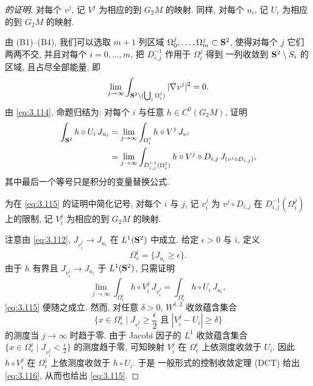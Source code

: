 \begin{proof}[ 的证明]
对每个 $v^j$, 记 $V^j$ 为相应的到 $G_2M$ 的映射. 同样, 对每个 $u_i$,
记 $U_i$ 为相应的到 $G_2M$ 的映射.

由 (B1)--(B4), 我们可以选取 $m+1$ 列区域
$\Omega_0^j,\dots,\Omega_m^j\subset\mathbf{S}^2$, 使得对每个 $j$ 它们两两不交,
并且对每个 $i=0,\dots,m$, 把 $D_{i,j}^{-1}$ 作用于 $\Omega_i^j$ 得到
一列收敛到 $\mathbf{S}^2\setminus S_i$ 的区域, 且占尽全部能量, 即
\begin{equation}
\lim_{j\to\infty}\int_{\mathbf{S}^2\setminus(\bigcup_i\Omega_i^j)}
 |\nabla v^j|^2=0.
\label{eq:3.114}
\end{equation}
由 \eqref{eq:3.114}, 命题归结为: 对每个 $i$ 与任意 $h\in C^0(G_2M)$, 证明
\begin{equation}
\begin{aligned}
\int_{\mathbf{S}^2}h\circ U_i\,J_{u_i}
&=\lim_{j\to\infty}\int_{\Omega_i^j}h\circ V^j\,J_{v^j}\\
&=\lim_{j\to\infty}\int_{D_{i,j}^{-1}(\Omega_i^j)}
 h\circ V^j\circ D_{i,j}\,J_{(v^j\circ D_{i,j})},
\end{aligned}
\label{eq:3.115}
\end{equation}
其中最后一个等号只是积分的变量替换公式.

为在 \eqref{eq:3.115} 的证明中简化记号, 对每个 $i$ 与 $j$, 记 $v_i^j$ 为
$v^j\circ D_{i,j}$ 在 $D_{i,j}^{-1}(\Omega_i^j)$ 上的限制, 记 $V_i^j$
为相应的到 $G_2M$ 的映射.

注意由 \eqref{eq:3.112}, $J_{v_i^j}\to J_{u_i}$ 在 $L^1(\mathbf{S}^2)$ 中成立. 给定
$\epsilon>0$ 与 $i$, 定义
\[
\Omega_\epsilon^i=\bigl\{J_{u_i}\geq\epsilon\bigr\}.
\]
由于 $h$ 有界且 $J_{v_i^j}\to J_{u_i}$ 于 $L^1(\mathbf{S}^2)$, 只需证明
\begin{equation}
\lim_{j\to\infty}\int_{\Omega_\epsilon^i}h\circ V_i^j\,J_{v_i^j}
 =\int_{\Omega_\epsilon^i}h\circ U_i\,J_{u_i},
\label{eq:3.116}
\end{equation}
\eqref{eq:3.115} 便随之成立. 然而, 对任意 $\delta>0$, $W^{1,2}$ 收敛蕴含集合
\begin{equation}
\bigl\{x\in\Omega_\epsilon^i\mid J_{v_i^j}\geq\frac\epsilon2
 \text{ 且 } |V_i^j-U_i|\geq\delta\bigr\}
\label{eq:3.117}
\end{equation}
的测度当 $j\to\infty$ 时趋于零. 由于 Jacobi 因子的 $L^1$ 收敛蕴含集合
$\{x\in\Omega_\epsilon^i\mid J_{v_i^j}<\frac\epsilon2\}$ 的测度趋于零,
可知映射 $V_i^j$ 在 $\Omega_\epsilon^i$ 上依测度收敛于 $U_i$. 因此
$h\circ V_i^j$ 在 $\Omega_\epsilon^i$ 上依测度收敛于 $h\circ U_i$. 于是
一般形式的控制收敛定理 (DCT) 给出 \eqref{eq:3.116}, 从而也给出 \eqref{eq:3.115}.
\end{proof}
